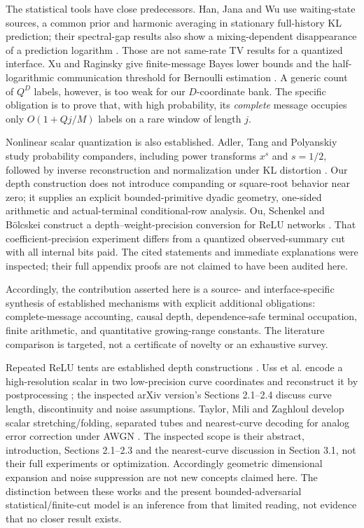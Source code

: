 \documentclass[11pt,letterpaper]{article}
\theoremstyle{definition}\newtheorem{definition}[theorem]{Definition}
\theoremstyle{remark}\newtheorem{remark}[theorem]{Remark}
\begin{document}
The statistical tools have close predecessors. Han, Jana and Wu use waiting-state sources, a common prior and harmonic averaging in stationary full-history KL prediction; their spectral-gap results also show a mixing-dependent disappearance of a prediction logarithm \citep{han2022}. Those are not same-rate TV results for a quantized interface. Xu and Raginsky give finite-message Bayes lower bounds and the half-logarithmic communication threshold for Bernoulli estimation \citep[Theorem 3 and Example 6]{xu2016}. A generic count of $Q^D$ labels, however, is too weak for our $D$-coordinate bank. The specific obligation is to prove that, with high probability, its \emph{complete} message occupies only $O(1+Qj/M)$ labels on a rare window of length $j$.

Nonlinear scalar quantization is also established. Adler, Tang and Polyanskiy study probability companders, including power transforms $x^s$ and $s=1/2$, followed by inverse reconstruction and normalization under KL distortion \citep[Sections I--III, Theorem 5]{adler2022}. Our depth construction does not introduce companding or square-root behavior near zero; it supplies an explicit bounded-primitive dyadic geometry, one-sided arithmetic and actual-terminal conditional-row analysis. Ou, Schenkel and B\"olcskei construct a depth--weight-precision conversion for ReLU networks \citep[Proposition 4.1]{ou2024}. That coefficient-precision experiment differs from a quantized observed-summary cut with all internal bits paid. The cited statements and immediate explanations were inspected; their full appendix proofs are not claimed to have been audited here.

Accordingly, the contribution asserted here is a source- and interface-specific synthesis of established mechanisms with explicit additional obligations: complete-message accounting, causal depth, dependence-safe terminal occupation, finite arithmetic, and quantitative growing-range constants. The literature comparison is targeted, not a certificate of novelty or an exhaustive survey.

Repeated ReLU tents are established depth constructions \citep[Section 3.3]{telgarsky2016}. Uss et al. encode a high-resolution scalar in two low-precision curve coordinates and reconstruct it by postprocessing \citep{uss2025}; the inspected arXiv version's Sections 2.1--2.4 discuss curve length, discontinuity and noise assumptions. Taylor, Mili and Zaghloul develop scalar stretching/folding, separated tubes and nearest-curve decoding for analog error correction under AWGN \citep{taylor2013}. The inspected scope is their abstract, introduction, Sections 2.1--2.3 and the nearest-curve discussion in Section 3.1, not their full experiments or optimization. Accordingly geometric dimensional expansion and noise suppression are not new concepts claimed here. The distinction between these works and the present bounded-adversarial statistical/finite-cut model is an inference from that limited reading, not evidence that no closer result exists.
\end{document}
